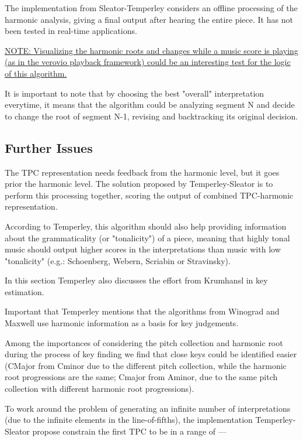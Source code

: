   The implementation from Sleator-Temperley considers an offline processing of the harmonic analysis, giving a final output after hearing the entire piece. It has not been tested in real-time applications.

  \underline{NOTE: Visualizing the harmonic roots and changes while a music score is playing (as in the verovio playback framework) could be an interesting test for the logic of this algorithm.}

  It is important to note that by choosing the best "overall" interpretation everytime, it means that the algorithm could be analyzing segment N and decide to change the root of segment N-1, revising and backtracking its original decision.


  \subsection{Further Issues}

  The TPC representation needs feedback from the harmonic level, but it goes prior the harmonic level. The solution proposed by Temperley-Sleator is to perform this processing together, scoring the output of combined TPC-harmonic representation.

  According to Temperley, this algorithm should also help providing information about the grammaticality (or "tonalicity") of a piece, meaning that highly tonal music should output higher scores in the interpretations than music with low "tonalicity" (e.g.: Schoenberg, Webern, Scriabin or Stravinsky).

  In this section Temperley also discusses the effort from Krumhansl in key estimation.

  Important that Temperley mentions that the algorithms from Winograd and Maxwell use harmonic information as a basis for key judgements.

  Among the importances of considering the pitch collection and harmonic root during the process of key finding we find that close keys could be identified easier (CMajor from Cminor due to the different pitch collection, while the harmonic root progressions are the same; Cmajor from Aminor, due to the same pitch collection with different harmonic root progressions).

  To work around the problem of generating an infinite number of interpretations (due to the infinite elements in the line-of-fifths), the implementation Temperley-Sleator propose constrain the first TPC to be in a range of ---

